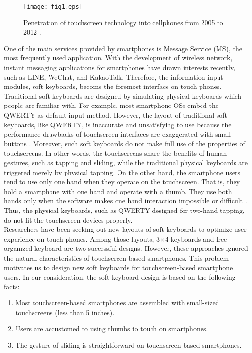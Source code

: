 \documentclass{singlecol-new}
\theoremstyle{TH}{
\newtheorem{lemma}{Lemma}
\newtheorem{theorem}[lemma]{Theorem}
\newtheorem{corrolary}[lemma]{Corrolary}
\newtheorem{conjecture}[lemma]{Conjecture}
\newtheorem{proposition}[lemma]{Proposition}
\newtheorem{claim}[lemma]{Claim}
\newtheorem{stheorem}[lemma]{Wrong Theorem}
\newtheorem{algorithm}{Algorithm}
}
\theoremstyle{THrm}{
\newtheorem{definition}{Definition}[section]
\newtheorem{question}{Question}[section]
\newtheorem{remark}{Remark}
\newtheorem{scheme}{Scheme}
}
\theoremstyle{THhit}{
\newtheorem{case}{Case}[section]
}
\begin{document}
\begin{figure}
  \centering
  \caption{Penetration of touchscreen technology into cellphones from 2005 to 2012 \citep{stranal}.}\label{fig.intro}
  \texttt{[image: fig1.eps]}
\end{figure}

One of the main services provided by smartphones is Message Service (MS), the most frequently used application. With the development of wireless network, instant messaging applications for smartphones have drawn interests recently, such as LINE, WeChat, and KakaoTalk. Therefore, the information input modules, soft keyboards, become the foremost interface on touch phones. Traditional soft keyboards are designed by simulating physical keyboards which people are familiar with. For example, most smartphone OSs embed the QWERTY as default input method. However, the layout of traditional soft keyboards, like QWERTY, is inaccurate and unsatisfying to use because the performance drawbacks of touchscreen interfaces are exaggerated with small buttons \citep{parikh2012negative}. Moreover, such soft keyboards do not make full use of the properties of touchscreens. In other words, the touchscreens share the benefits of human gestures, such as tapping and sliding, while the traditional physical keyboards are triggered merely by physical tapping. On the other hand, the smartphone users tend to use only one hand when they operate on the touchscreen. That is, they hold a smartphone with one hand and operate with a thumb. They use both hands only when the software makes one hand interaction impossible or difficult \citep{park2010touch}. Thus, the physical keyboards, such as QWERTY designed for two-hand tapping, do not fit the touchscreen devices properly. \\

Researchers have been seeking out new layouts of soft keyboards to optimize user experience on touch phones. Among those layouts, 3$\times$4 keyboards and free organized keyboard are two successful designs. However, these approaches ignored the natural characteristics of touchscreen-based smartphones. This problem motivates us to design new soft keyboards for touchscreen-based smartphone users. In our consideration, the soft keyboard design is based on the following facts:
\begin{enumerate}
  \item Most touchscreen-based smartphones are assembled with small-sized touchscreens (less than 5 inches).
  \item Users are accustomed to using thumbs to touch on smartphones.
  \item The gesture of sliding is straightforward on touchscreen-based smartphones.
\end{enumerate}
\end{document}
